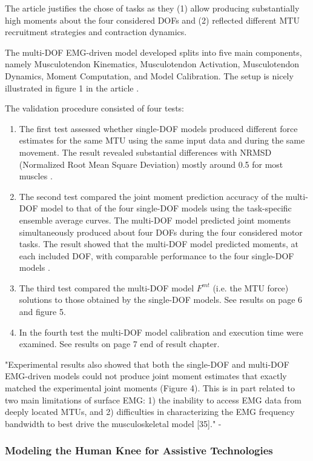 The article justifies the chose of tasks as they (1) allow producing substantially high moments about the four considered DOFs and (2) reflected different MTU recruitment strategies and contraction dynamics.

The multi-DOF EMG-driven model developed splits into five main components, namely Musculotendon Kinematics, Musculotendon Activation, Musculotendon Dynamics, Moment Computation, and Model Calibration. The setup is nicely illustrated in figure 1 in the article \cite[Fig. 1]{Sartori2012a}.

The validation procedure consisted of four tests:
\begin{enumerate}
    \item The first test assessed whether single-DOF models produced different force estimates for the same MTU using the same input data and during the same movement. The result revealed substantial differences with NRMSD (Normalized Root Mean Square Deviation) mostly around 0.5 for most muscles \cite[Fig. 3]{Sartori2012a}.
    \item The second test compared the joint moment prediction accuracy of the multi-DOF model to that of the four single-DOF models using the task-specific ensemble average curves. The multi-DOF model predicted joint moments simultaneously produced about four DOFs during the four considered motor tasks. The result showed that the multi-DOF model predicted moments, at each included DOF, with comparable performance to the four single-DOF models \cite[Fig. 4]{Sartori2012a}.
    \item The third test compared the multi-DOF model $F^{mt}$ (i.e. the MTU force) solutions to those obtained by the single-DOF models. See results on page 6 and figure 5.
    \item In the fourth test the multi-DOF model calibration and execution time were examined. See results on page 7 end of result chapter.
\end{enumerate}

"Experimental results also showed that both the single-DOF and multi-DOF EMG-driven models could not produce joint moment estimates that exactly matched the experimental joint moments (Figure 4). This is in part related to two main limitations of surface EMG: 1) the inability to access EMG data from deeply located MTUs, and 2) difficulties in characterizing the EMG frequency bandwidth to best drive the musculoskeletal model [35]." - \cite[p. 11]{Sartori2012a}

\subsubsection{Modeling the Human Knee for Assistive Technologies}

